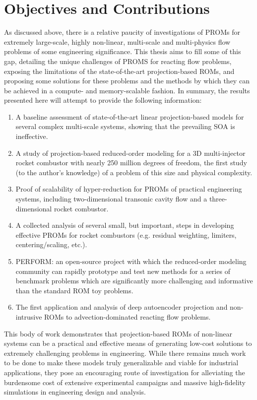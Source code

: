 \section{Objectives and Contributions}

As discussed above, there is a relative paucity of investigations of PROMs for extremely large-scale, highly non-linear, multi-scale and multi-physics flow problems of some engineering significance. This thesis aims to fill some of this gap, detailing the unique challenges of PROMS for reacting flow problems, exposing the limitations of the state-of-the-art projection-based ROMs, and proposing some solutions for these problems and the methods by which they can be achieved in a compute- and memory-scalable fashion. In summary, the results presented here will attempt to provide the following information:

\begin{enumerate}
    \item A baseline assessment of state-of-the-art linear projection-based models for several complex multi-scale systems, showing that the prevailing SOA is ineffective.
    \item A study of projection-based reduced-order modeling for a 3D multi-injector rocket combustor with nearly 250 million degrees of freedom, the first study (to the author's knowledge) of a problem of this size and physical complexity.
    \item Proof of scalability of hyper-reduction for PROMs of practical engineering systems, including two-dimensional transonic cavity flow and a three-dimensional rocket combustor.
    \item A collected analysis of several small, but important, steps in developing effective PROMs for rocket combustors (e.g. residual weighting, limiters, centering/scaling, etc.).
    \item PERFORM: an open-source project with which the reduced-order modeling community can rapidly prototype and test new methods for a series of benchmark problems which are significantly more challenging and informative than the standard ROM toy problems.
    \item The first application and analysis of deep autoencoder projection and non-intrusive ROMs to advection-dominated reacting flow problems.
\end{enumerate}

This body of work demonstrates that projection-based ROMs of non-linear systems can be a practical and effective means of generating low-cost solutions to extremely challenging problems in engineering. While there remains much work to be done to make these models truly generalizable and viable for industrial applications, they pose an encouraging route of investigation for alleviating the burdensome cost of extensive experimental campaigns and massive high-fidelity simulations in engineering design and analysis.